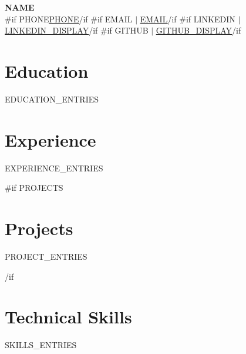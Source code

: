 \documentclass[letterpaper,11pt]{article}
\newcommand{\resumeSubHeadingListStart}{\begin{itemize}[leftmargin=0.15in, label={}]}
\newcommand{\resumeSubHeadingListEnd}{\end{itemize}}
\begin{document}
\begin{center}
    \textbf{\Huge \scshape {{NAME}}} \\ \vspace{4pt}
    \small
    {{#if PHONE}}\href{tel:{{PHONE}}}{\underline{{{PHONE}}}}{{/if}}
    {{#if EMAIL}} $|$ \href{mailto:{{EMAIL}}}{\underline{{{EMAIL}}}}{{/if}}
    {{#if LINKEDIN}} $|$ \href{{{LINKEDIN}}}{\underline{{{LINKEDIN_DISPLAY}}}}{{/if}}
    {{#if GITHUB}} $|$ \href{{{GITHUB}}}{\underline{{{GITHUB_DISPLAY}}}}{{/if}}
\end{center}

\section{Education}
  \resumeSubHeadingListStart
    {{EDUCATION_ENTRIES}}
  \resumeSubHeadingListEnd

\section{Experience}
  \resumeSubHeadingListStart
    {{EXPERIENCE_ENTRIES}}
  \resumeSubHeadingListEnd

{{#if PROJECTS}}
\section{Projects}
    \resumeSubHeadingListStart
      {{PROJECT_ENTRIES}}
    \resumeSubHeadingListEnd
{{/if}}

\section{Technical Skills}
 \begin{itemize}[leftmargin=0.15in, label={}]
    \small{\item{
     {{SKILLS_ENTRIES}}
    }}
 \end{itemize}
\end{document}

